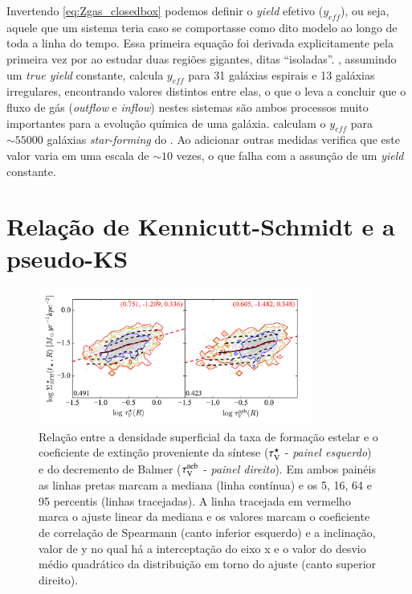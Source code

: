Invertendo \eqref{eq:Zgas_closedbox} podemos definir o {\em yield} efetivo ($y_{eff}$), ou seja,
aquele que um sistema teria caso se comportasse como dito modelo ao longo de toda a linha do tempo.
Essa primeira equação foi derivada explicitamente pela primeira vez por \citet{Searle.Sargent.1972a}
ao estudar duas regiões \Hii gigantes, ditas ``isoladas''. \citet{Garnett.2002a}, assumindo um {\em
true yield} constante, calcula $y_{eff}$ para 31 galáxias espirais e 13 galáxias irregulares,
encontrando valores distintos entre elas, o que o leva a concluir que o fluxo de gás ({\em outflow}
e {\em inflow}) nestes sistemas são ambos processos muito importantes para a evolução química de uma
galáxia. \citet{Tremonti.etal.2004a} calculam o $y_{eff}$ para $\sim 55000$ galáxias {\em
star-forming} do \SDSS. Ao adicionar outras medidas verifica que este valor varia em uma escala de
$\sim 10$ vezes, o que falha com a assunção de um {\em yield} constante. 

\section{Relação de Kennicutt-Schmidt e a pseudo-KS}
\label{sec:gasfrac:KS}

\begin{figure}
	\centering
	\includegraphics[width=0.8\textwidth]{figuras/pseudoKS.pdf}
	\caption[Relação pseudo-KS.]
	{Relação entre a densidade superficial da taxa de formação estelar e o coeficiente de extinção
proveniente da síntese ($\tau_{\mathrm{V}}^\star$ - {\em painel esquerdo}) e do decremento de Balmer ($\tau_{\mathrm{V}}^{\mathrm{neb}}$ -
{\em painel direito}). Em ambos painéis as linhas pretas marcam a mediana (linha contínua) e os 5,
16, 64 e 95 percentis (linhas tracejadas). A linha tracejada em vermelho marca o ajuste linear da
mediana e os valores marcam o coeficiente de correlação de Spearmann (canto inferior esquerdo) e a
inclinação, valor de y no qual há a interceptação do eixo x e o valor do desvio médio quadrático da
distribuição em torno do ajuste (canto superior direito).}
	\label{fig:pseudoKS}
\end{figure}


